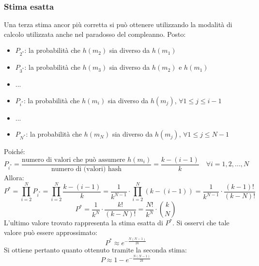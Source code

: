 \subsubsection{Stima esatta}

Una terza stima ancor più corretta si può ottenere utilizzando la modalità di calcolo utilizzata anche nel paradosso del compleanno. Posto:
\begin{itemize}
\item $P_{2^{*}}$: la probabilità che $h(m_2)$ sia diverso da $h(m_1)$
\item $P_{3^{*}}$: la probabilità che $h(m_3)$ sia diverso da $h(m_2)$ e $h(m_1)$
\item ...
\item $P_{i^{*}}$: la probabilità che $h(m_i)$ sia diverso da $h(m_j)$, $\forall 1\leq j \leq i-1$
\item ...
\item $P_{N^{*}}$: la probabilità che $h(m_N)$ sia diverso da $h(m_j)$, $\forall 1\leq j \leq N-1$
\end{itemize}
Poiché:
\begin{equation}
P_{i^{*}} = \frac{\text{numero di valori che può assumere } h(m_i)}{\text{numero di (valori) hash}} = \frac{k - (i - 1)}{k} \quad \forall i = 1,2,...,N
\end{equation}
Allora:
\begin{equation}
P^{*}= \prod_{i=2}^N P_{i^{*}} = \prod_{i=2}^N \frac{k - (i - 1)}{k} = \frac{1}{k^{N - 1}} \cdot \prod_{i=2}^N (k - (i - 1)) = \frac{1}{k^{N - 1}} \cdot \frac{(k - 1)!}{(k - N)!} 
\end{equation}
\begin{equation}
P^{*} =  \frac{1}{k^{N}} \cdot \frac{k!}{(k - N)!} =  \frac{N!}{k^{N}} \cdot \binom {k}{N}
\end{equation}
L'ultimo valore trovato rappresenta la stima esatta di $P^{*}$. Si osservi che tale valore può essere approssimato:
\begin{equation}
P^{*} \approx e^{-\frac{N(N-1)}{2k}}
\end{equation}
Si ottiene pertanto quanto ottenuto tramite la seconda stima:
\begin{equation}
P \approx 1 - e^{-\frac{N(N-1)}{2k}}
\end{equation}

